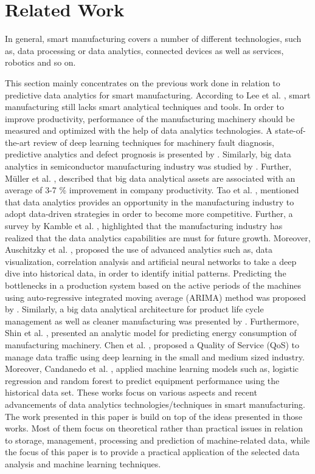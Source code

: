 \documentclass[runningheads]{llncs}
\begin{document}
\section{Related Work}
\label{sec:relatedwork}
In general, smart manufacturing covers a number of different technologies, such as, data processing or data analytics, connected devices as well as services, robotics and so on. 

This section mainly concentrates on the previous work done in relation to predictive data analytics for smart manufacturing. According to Lee et al. \cite{Lee}, smart manufacturing still lacks smart analytical techniques and tools. In order to improve productivity, performance of the manufacturing machinery should be measured and optimized with the help of data analytics technologies. A state-of-the-art review of deep learning techniques for machinery fault diagnosis, predictive analytics and defect prognosis is presented by \cite{Wang}. Similarly, big data analytics in semiconductor manufacturing industry was studied by \cite{Moyne}. Further, M\"uller et al. \cite{Muller}, described that big data analytical assets are associated with an average of 3-7 \% improvement in company productivity. Tao et al. \cite{Tao}, mentioned that data analytics provides an opportunity in the manufacturing industry to adopt data-driven strategies in order to become more competitive. Further, a survey by Kamble et al. \cite{Kamble}, highlighted that the manufacturing industry has realized that the data analytics capabilities are must for future growth. Moreover, Auschitzky et al. \cite{Auschitzky}, proposed the use of advanced analytics such as, data visualization, correlation analysis and artificial neural networks to take a deep dive into historical data, in order to identify initial patterns. Predicting the bottlenecks in a production system based on the active periods of the machines using auto-regressive integrated moving average (ARIMA) method was proposed by \cite{Subramaniyan}. Similarly, a big data analytical architecture for product life cycle management as well as cleaner manufacturing was presented by \cite{Zhang}. Furthermore, Shin et al. \cite{Shin}, presented an analytic model for predicting energy consumption of manufacturing machinery. Chen et al. \cite{Chen}, proposed a Quality of Service (QoS) to manage data traffic using deep learning in the small and medium sized industry. Moreover, Candanedo et al. \cite{Candanedo}, applied machine learning models such as, logistic regression and random forest to predict equipment performance using the historical data set. These works focus on various aspects and recent advancements of data analytics technologies/techniques in smart manufacturing. The work presented in this paper is build on top of the ideas presented in those works. Most of them focus on theoretical rather than practical issues in relation to storage, management, processing and prediction of machine-related data, while the focus of this paper is to provide a practical application of the selected data analysis and machine learning techniques.
\end{document}

